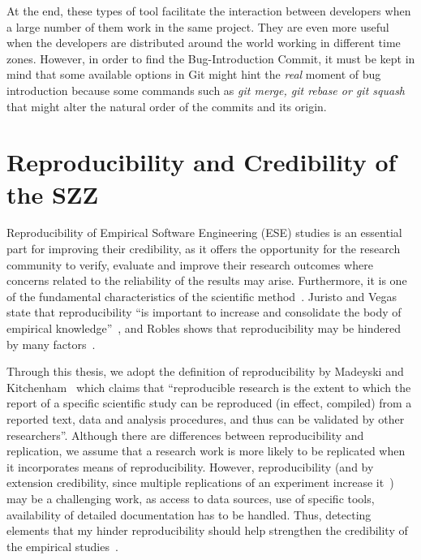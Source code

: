 \documentclass[a4paper, 12pt]{book}
\begin{document}
At the end, these types of tool facilitate the interaction between developers when a large number of them work in the same project. They are even more useful when the developers are distributed around the world working in different time zones. However, in order to find the Bug-Introduction Commit, it must be kept in mind that some available options in Git might hint the \emph{real} moment of bug introduction because some commands such as \emph{git merge, git rebase or git squash} that might alter the natural order of the commits and its origin. %



\cleardoublepage
\chapter{Reproducibility and Credibility of the SZZ}
\label{chap:credibility}

Reproducibility of Empirical Software Engineering (ESE) studies is an essential part for improving their credibility, as it offers the opportunity for the research community to verify, evaluate and improve their research outcomes where concerns related to the reliability of the results may arise. Furthermore, it is one of the fundamental characteristics of the scientific method~\cite{gonzalez2012reproducibility}. Juristo and Vegas state that reproducibility ``is important to increase and consolidate the body of empirical knowledge''~\cite{juristo2009using}, and Robles shows that reproducibility may be hindered by many factors~\cite{robles2010replicating}. 

Through this thesis, we adopt the definition of reproducibility by Madeyski and Kitchenham~\cite{madeyski2017would} which claims that ``reproducible research is the extent to which the report of a specific scientific  study can be reproduced (in  effect, compiled) from a reported text, data and analysis procedures, and thus can be validated by other researchers''. Although there are differences between reproducibility and replication, we assume that a research work is more likely to be replicated when it incorporates means of reproducibility. However, reproducibility  (and by extension credibility, since multiple replications of an experiment increase it~\cite{juristo2009using}) may be a challenging work, as access to data sources, use of specific tools, availability of detailed documentation has to be handled. Thus, detecting elements that my hinder reproducibility should help strengthen the credibility of the empirical studies~\cite{perry2000empirical}. 
\end{document}
